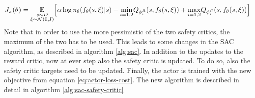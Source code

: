 \begin{equation}
    J_\pi(\theta) = \underset{\begin{subarray}{c}
        s\sim D\\
        \xi\sim \mathcal{N}(0, I)
    \end{subarray}}{\mathbb{E}}\Big[\alpha\log\pi_\theta(f_\theta(s, \xi)|s)-\underset{i=1,2}{\min}Q_{\phi_i^R}(s,f_\theta(s, \xi))+\underset{i=1,2}{\max}Q_{\phi_i^C}(s,f_\theta(s, \xi))\Big]
    \label{eq:actor-loss-cost}
\end{equation}
Note that in order to use the more pessimistic of the two safety critics, the maximum of the two has to be used. This leads to some changes in the SAC algorithm, as described in algorithm \ref{alg:sac}. In addition to the updates to the reward critic, now at ever step also the safety critic is updated. To do so, also the safety critic targets need to be updated. Finally, the actor is trained with the new objective from equation \ref{eq:actor-loss-cost}. The new algorithm is described in detail in algorithm \ref{alg:sac-safety-critic}


